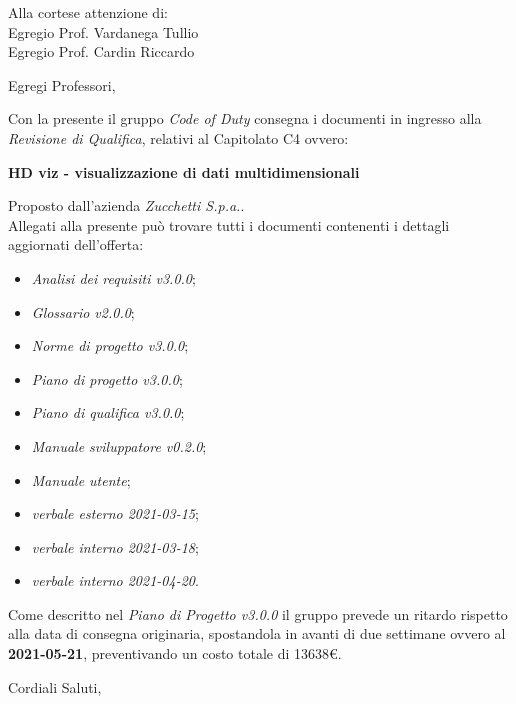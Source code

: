 \documentclass[11pt]{letter}
\begin{document}
\begin{letter}{Alla cortese attenzione di: \\ Egregio Prof. Vardanega Tullio \\ Egregio Prof. Cardin Riccardo}
\date{21 Aprile, 2021}
\opening{Egregi Professori,}
Con la presente il gruppo \textit{Code of Duty} consegna i documenti in ingresso alla \textit{Revisione di Qualifica}, relativi al Capitolato C4 ovvero:
\begin{center}
    \textbf{HD viz -  visualizzazione di dati multidimensionali}
\end{center}
Proposto dall'azienda \textit{Zucchetti S.p.a.}.\\
Allegati alla presente può trovare tutti i documenti contenenti i dettagli aggiornati dell'offerta:
\begin{itemize}
    \item \textit{Analisi dei requisiti v3.0.0};
    \item \textit{Glossario v2.0.0};
    \item \textit{Norme di progetto v3.0.0};
    \item \textit{Piano di progetto v3.0.0};
    \item \textit{Piano di qualifica v3.0.0};
    \item \textit{Manuale sviluppatore v0.2.0};
    \item \textit{Manuale utente};
    \item \textit{verbale esterno 2021-03-15};
    \item \textit{verbale interno 2021-03-18};
    \item \textit{verbale interno 2021-04-20}.
\end{itemize}

\pagebreak

Come descritto nel \textit{Piano di Progetto v3.0.0} il gruppo prevede un ritardo rispetto alla data di consegna originaria, spostandola in avanti di due settimane ovvero al \textbf{2021-05-21}, preventivando un costo totale di 13638€.
\closing{Cordiali Saluti,}
\end{letter}
\end{document}
